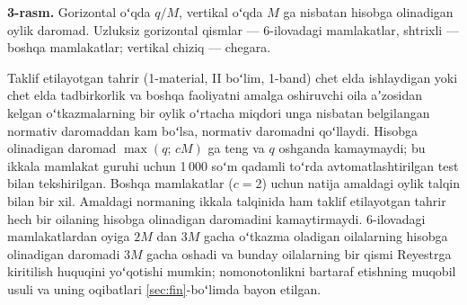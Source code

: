 \documentclass[14pt,a4paper]{extarticle}
\begin{document}
\begin{center}
\end{center}
\textbf{3-rasm.} Gorizontal oʻqda $q/M$, vertikal oʻqda $M$ ga nisbatan hisobga olinadigan oylik daromad. Uzluksiz gorizontal qismlar — 6-ilovadagi mamlakatlar, shtrixli — boshqa mamlakatlar; vertikal chiziq — chegara.

Taklif etilayotgan tahrir (1-material, II boʻlim, 1-band) chet elda ishlaydigan yoki chet elda tadbirkorlik va boshqa faoliyatni amalga oshiruvchi oila aʼzosidan kelgan oʻtkazmalarning bir oylik oʻrtacha miqdori unga nisbatan belgilangan normativ daromaddan kam boʻlsa, normativ daromadni qoʻllaydi. Hisobga olinadigan daromad $\max(q;\,cM)$ ga teng va $q$ oshganda kamaymaydi; bu ikkala mamlakat guruhi uchun 1\,000 soʻm qadamli toʻrda avtomatlashtirilgan test bilan tekshirilgan. Boshqa mamlakatlar ($c=2$) uchun natija amaldagi oylik talqin bilan bir xil. Amaldagi normaning ikkala talqinida ham taklif etilayotgan tahrir hech bir oilaning hisobga olinadigan daromadini kamaytirmaydi. 6-ilovadagi mamlakatlardan oyiga $2M$ dan $3M$ gacha oʻtkazma oladigan oilalarning hisobga olinadigan daromadi $3M$ gacha oshadi va bunday oilalarning bir qismi Reyestrga kiritilish huquqini yoʻqotishi mumkin; nomonotonlikni bartaraf etishning muqobil usuli va uning oqibatlari \ref{sec:fin}-boʻlimda bayon etilgan.
\end{document}
